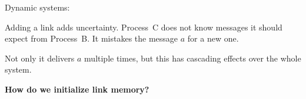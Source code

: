 \documentclass[10pt, xcolor={usenames, dvipsnames}]{beamer}
\newcommand{\xmark}{\ding{55}}
\newcommand{\NO}[1]{\textcolor{red}{#1}}
\begin{document}
\begin{frame}{Dynamic systems: \NO{\xmark}}
  
  \begin{minipage}{0.24\textwidth}
    \centering
        
  \end{minipage}
  \begin{minipage}{0.24\textwidth}
    \centering
        
  \end{minipage}
  \begin{minipage}{0.24\textwidth}
    \centering
        
  \end{minipage}
  \begin{minipage}{0.24\textwidth}
    \centering
    
  \end{minipage}
  
  \vspace{1.5em}

  Adding a link adds uncertainty. Process~C does not know messages it should
  expect from Process~B. It mistakes the message $a$ for a new one.

  Not only it delivers $a$ multiple times, but this has cascading effects over
  the whole system.

  \vspace{1em}
  
  \textbf{How do we initialize link memory?}
  
\end{frame}
\end{document}
